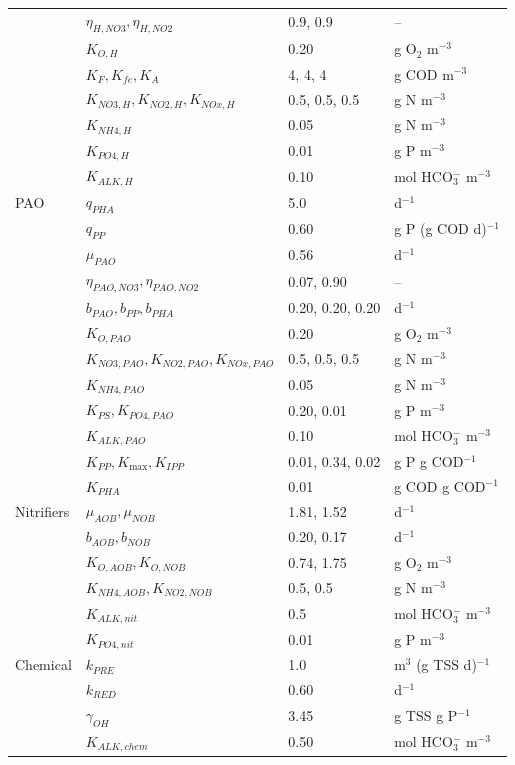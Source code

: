 \documentclass[a4paper,fleqn]{cas-sc}
\begin{document}
\begin{longtable}{llll}
 & $\eta_{H,NO3},\eta_{H,NO2}$ & 0.9, 0.9 & -- \\
 & $K_{O,H}$ & 0.20 & g O$_2$ m$^{-3}$ \\
 & $K_F,K_{fe},K_A$ & 4, 4, 4 & g COD m$^{-3}$ \\
 & $K_{NO3,H},K_{NO2,H},K_{NOx,H}$ & 0.5, 0.5, 0.5 & g N m$^{-3}$ \\
 & $K_{NH4,H}$ & 0.05 & g N m$^{-3}$ \\
 & $K_{PO4,H}$ & 0.01 & g P m$^{-3}$ \\
 & $K_{ALK,H}$ & 0.10 & mol HCO$_3^-$ m$^{-3}$ \\
PAO & $q_{PHA}$ & 5.0 & d$^{-1}$ \\
 & $q_{PP}$ & 0.60 & g P (g COD d)$^{-1}$ \\
 & $\mu_{PAO}$ & 0.56 & d$^{-1}$ \\
 & $\eta_{PAO,NO3},\eta_{PAO,NO2}$ & 0.07, 0.90 & -- \\
 & $b_{PAO},b_{PP},b_{PHA}$ & 0.20, 0.20, 0.20 & d$^{-1}$ \\
 & $K_{O,PAO}$ & 0.20 & g O$_2$ m$^{-3}$ \\
 & $K_{NO3,PAO},K_{NO2,PAO},K_{NOx,PAO}$ & 0.5, 0.5, 0.5 & g N m$^{-3}$ \\
 & $K_{NH4,PAO}$ & 0.05 & g N m$^{-3}$ \\
 & $K_{PS},K_{PO4,PAO}$ & 0.20, 0.01 & g P m$^{-3}$ \\
 & $K_{ALK,PAO}$ & 0.10 & mol HCO$_3^-$ m$^{-3}$ \\
 & $K_{PP},K_{\max},K_{IPP}$ & 0.01, 0.34, 0.02 & g P g COD$^{-1}$ \\
 & $K_{PHA}$ & 0.01 & g COD g COD$^{-1}$ \\
Nitrifiers & $\mu_{AOB},\mu_{NOB}$ & 1.81, 1.52 & d$^{-1}$ \\
 & $b_{AOB},b_{NOB}$ & 0.20, 0.17 & d$^{-1}$ \\
 & $K_{O,AOB},K_{O,NOB}$ & 0.74, 1.75 & g O$_2$ m$^{-3}$ \\
 & $K_{NH4,AOB},K_{NO2,NOB}$ & 0.5, 0.5 & g N m$^{-3}$ \\
 & $K_{ALK,nit}$ & 0.5 & mol HCO$_3^-$ m$^{-3}$ \\
 & $K_{PO4,nit}$ & 0.01 & g P m$^{-3}$ \\
Chemical & $k_{PRE}$ & 1.0 & m$^3$ (g TSS d)$^{-1}$ \\
 & $k_{RED}$ & 0.60 & d$^{-1}$ \\
 & $\gamma_{OH}$ & 3.45 & g TSS g P$^{-1}$ \\
 & $K_{ALK,chem}$ & 0.50 & mol HCO$_3^-$ m$^{-3}$ \\
\bottomrule
\end{longtable}
\end{document}
